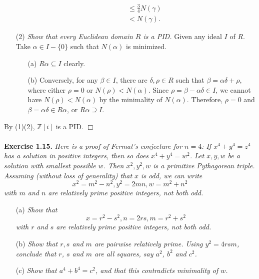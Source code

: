 \documentclass{article}
\begin{document}
\begin{enumerate}
\begin{enumerate}
\begin{align*}
&\leq \frac{3}{4} N(\gamma) \\
&< N(\gamma).
\end{align*}
\end{enumerate}
\item[(2)]
\emph{Show that every Euclidean domain $R$ is a PID.}
Given any ideal $I$ of $R$.
Take $\alpha \in I-\{0\}$ such that $N(\alpha)$ is minimized.
\begin{enumerate}
  \item[(a)]
  $R\alpha \subseteq I$ clearly.
  \item[(b)]
  Conversely, for any $\beta \in I$, there are $\delta, \rho \in R$
  such that $\beta = \alpha \delta + \rho$, where either $\rho = 0$
  or $N(\rho) < N(\alpha)$.
  Since $\rho = \beta - \alpha \delta \in I$,
  we cannot have $N(\rho) < N(\alpha)$ by the minimality of $N(\alpha)$.
  Therefore, $\rho = 0$ and $\beta = \alpha \delta \in R\alpha$,
  or $R\alpha \supseteq I$.
\end{enumerate}
\end{enumerate}
By (1)(2),
$\mathbb{Z}[i]$ is a PID.
$\Box$ \\\\






\textbf{Exercise 1.15.}
\emph{Here is a proof of Fermat's conjecture for $n = 4$:
If $x^4 + y^4 = z^4$ has a solution in positive integers,
then so does $x^4 + y^4 = w^2$.
Let $x,y,w$ be a solution with smallest possible $w$.
Then $x^2, y^2, w$ is a primitive Pythagorean triple.
Assuming (without loss of generality) that $x$ is odd,
we can write
$$x^2 = m^2-n^2, y^2 = 2mn, w = m^2+n^2$$
with $m$ and $n$ are relatively prime positive integers, not both odd. }
\begin{enumerate}
\item[(a)]
\emph{Show that
$$x=r^2-s^2, n=2rs, m=r^2+s^2$$
with $r$ and $s$ are relatively prime positive integers, not both odd. }
\item[(b)]
\emph{Show that $r,s$ and $m$ are pairwise relatively prime.
Using $y^2 = 4rsm$, conclude that $r$, $s$ and $m$ are all squares, say
$a^2$, $b^2$ and $c^2$. }
\item[(c)]
\emph{Show that $a^4+b^4=c^2$, and that this contradicts minimality of $w$. } \\
\end{enumerate}
\end{document}
